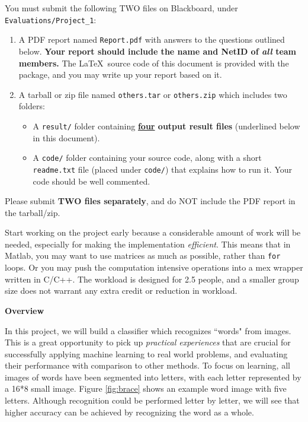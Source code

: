 \documentclass[11pt]{report}
\begin{document}
	You must submit the following TWO files on Blackboard, under \verb#Evaluations/Project_1#:
	\vspace{-1em}
	\begin{enumerate}
		\item  A PDF report named \verb#Report.pdf# with answers to the questions outlined below.
		{\bf Your report should include the name and NetID of \emph{all} team members.}
		The \LaTeX\ source code of this document is provided with the package, and you may write up your report based on it.
		\item A tarball or zip file named \verb#others.tar# or \verb#others.zip# which includes two folders: 
		\begin{itemize}[leftmargin=*]
			\item A \verb#result/# folder containing {\bf \underline{four} output result files} (underlined below in this document).
			\item A \verb#code/# folder containing your source code, along with a short \verb#readme.txt# file (placed under \verb#code/#) that explains how to run it.
			Your code should be well commented.
		\end{itemize}
	\end{enumerate}
	\vspace{-1em}
	
	Please submit {\bf TWO files separately}, and do NOT include the PDF report in the tarball/zip.
	
	
	Start working on the project early
	because a considerable amount of work will be needed,
	especially for making the implementation \emph{efficient}.
	This means that in Matlab, you may want to use matrices as much as possible,
	rather than \verb#for# loops.
	Or you may push the computation intensive operations into a mex wrapper written in C/C++.
	The workload is designed for 2.5 people, and a smaller group size  does not warrant any extra credit or reduction in workload.
	
	
	
	
	{\bf \large Overview}
	
	
	
	
	In this project, we will build a classifier which recognizes ``words" from images.
	This is a great opportunity to pick up \emph{practical experiences} that are crucial for successfully applying machine learning to real world problems,
	and evaluating their performance with comparison to other methods.
	To focus on learning, all images of words have been segmented into letters,
	with each letter represented by a 16*8 small image.
	Figure \ref{fig:brace} shows an example word image with five letters.
	Although recognition could be performed letter by letter,
	we will see that higher accuracy can be achieved by recognizing the word as a whole.
	
\end{document}
